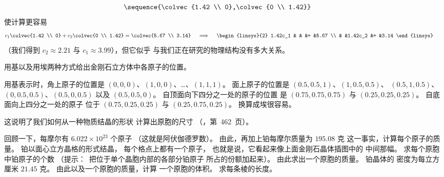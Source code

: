 \begin{exercises}
\begin{answer}
\begin{exparts}
\begin{equation*}
            \sequence{\colvec{1.42 \\ 0},\colvec{0 \\ 1.42}}
          \tag*{}\end{equation*}
          使计算更容易
          \begin{equation*}
            c_1\colvec{1.42 \\ 0}+c_2\colvec{0 \\ 1.42}
              =\colvec{5.67 \\ 3.14}
            \quad\implies\quad
            \begin{linsys}{2}
              1.42c_1  &   &         &=  &5.67  \\
                       &   &1.42c_2  &=  &3.14
            \end{linsys}
          \tag*{}\end{equation*}
          （我们得到 $c_2\approx 2.21$ 与 $c_1\approx 3.99$），但它似乎
          与我们正在研究的物理结构没有多大关系。
      \end{exparts}
    \end{answer}
  \item 
    用基以及用埃两种方式给出金刚石立方体中各原子的位置。
    \begin{answer}
      用基表示时，角上原子的位置是
      $(0,0,0)$、$(1,0,0)$、\ldots{}、$(1,1,1)$。
      面上原子的位置是 $(0.5,0.5,1)$、$(1,0.5,0.5)$、
      $(0.5,1,0.5)$、$(0,0.5,0.5)$、$(0.5,0,0.5)$ 以及 $(0.5,0.5,0)$。
      自顶面向下四分之一处的原子的位置
      是 $(0.75,0.75,0.75)$ 与 $(0.25,0.25,0.25)$。
      自底面向上四分之一处的原子
      位于 $(0.75,0.25,0.25)$ 与 $(0.25,0.75,0.25)$。
      换算成埃很容易。
    \end{answer}
  \item 
    这说明了我们如何从一种物质结晶的形状
    计算出原胞的尺寸
    （\cite{Ebbing}，第~462~页）。
    \begin{exparts}
      \partsitem 回顾一下，每摩尔有 $6.022\times 10^{23}$ 个原子
        （这就是阿伏伽德罗数）。
        由此，再加上铂每摩尔质量为 $195.08$ 克
        这一事实，计算每个原子的质量。
      \partsitem 铂以面心立方晶格的形式结晶，
        每个格点上都有一个原子，
        也就是说，它看起来像上面金刚石晶体插图中的
        中间那幅。
        求每个原胞中铂原子的个数
        （提示：~把位于单个晶胞内部的各部分铂原子
        所占的份额加起来）。
      \partsitem 由此求出一个原胞的质量。
      \partsitem 铂晶体的
        密度为每立方厘米 $21.45$ 克。
        由此以及一个原胞的质量，计算
        一个原胞的体积。
      \partsitem 求每条棱的长度。

\end{exparts}
\end{exercises}
